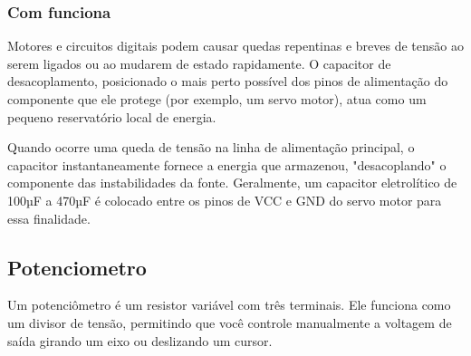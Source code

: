 \documentclass{report}
\begin{document}
	\subsubsection{Com funciona}
	
	Motores e circuitos digitais podem causar quedas repentinas e breves de tensão ao serem ligados ou ao mudarem de estado rapidamente. O capacitor de desacoplamento, posicionado o mais perto possível dos pinos de alimentação do componente que ele protege (por exemplo, um servo motor), atua como um pequeno reservatório local de energia.
	
	Quando ocorre uma queda de tensão na linha de alimentação principal, o capacitor instantaneamente fornece a energia que armazenou, "desacoplando" o componente das instabilidades da fonte. Geralmente, um capacitor eletrolítico de 100µF a 470µF é colocado entre os pinos de VCC e GND do servo motor para essa finalidade.
	
	\subsection{Potenciometro}
	
	Um potenciômetro é um resistor variável com três terminais. Ele funciona como um divisor de tensão, permitindo que você controle manualmente a voltagem de saída girando um eixo ou deslizando um cursor.
	
	

	
	
	
	
	
	
	
	 
	

	

	
\end{document}
